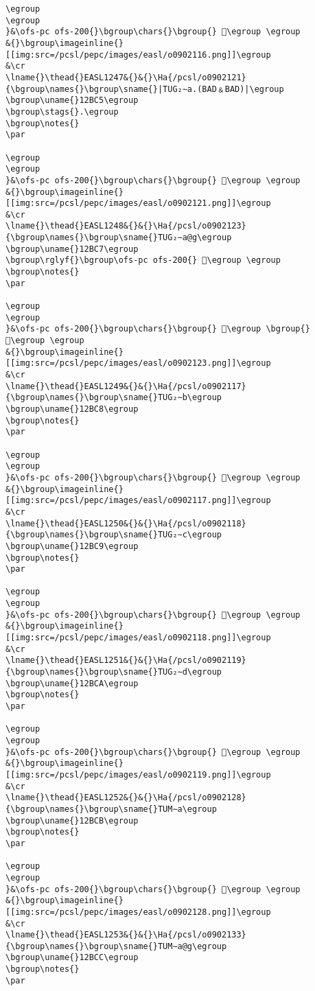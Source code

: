 \begin{verbatim}
\egroup
\egroup
}&\ofs-pc ofs-200{}\bgroup\chars{}\bgroup{} 𒯄\egroup \egroup
&{}\bgroup\imageinline{}[[img:src=/pcsl/pepc/images/easl/o0902116.png]]\egroup
&\cr
\lname{}\thead{}EASL1247&{}&{}\Ha{/pcsl/o0902121}{\bgroup\names{}\bgroup\sname{}|TUG₂∼a.(BAD﹠BAD)|\egroup
\bgroup\uname{}12BC5\egroup
\bgroup\stags{}.\egroup
\bgroup\notes{}
\par 

\egroup
\egroup
}&\ofs-pc ofs-200{}\bgroup\chars{}\bgroup{} 𒯅\egroup \egroup
&{}\bgroup\imageinline{}[[img:src=/pcsl/pepc/images/easl/o0902121.png]]\egroup
&\cr
\lname{}\thead{}EASL1248&{}&{}\Ha{/pcsl/o0902123}{\bgroup\names{}\bgroup\sname{}TUG₂∼a@g\egroup
\bgroup\uname{}12BC7\egroup
\bgroup\rglyf{}\bgroup\ofs-pc ofs-200{} 𒯇\egroup \egroup
\bgroup\notes{}
\par 

\egroup
\egroup
}&\ofs-pc ofs-200{}\bgroup\chars{}\bgroup{} 𒯆\egroup \bgroup{} 𒯇\egroup \egroup
&{}\bgroup\imageinline{}[[img:src=/pcsl/pepc/images/easl/o0902123.png]]\egroup
&\cr
\lname{}\thead{}EASL1249&{}&{}\Ha{/pcsl/o0902117}{\bgroup\names{}\bgroup\sname{}TUG₂∼b\egroup
\bgroup\uname{}12BC8\egroup
\bgroup\notes{}
\par 

\egroup
\egroup
}&\ofs-pc ofs-200{}\bgroup\chars{}\bgroup{} 𒯈\egroup \egroup
&{}\bgroup\imageinline{}[[img:src=/pcsl/pepc/images/easl/o0902117.png]]\egroup
&\cr
\lname{}\thead{}EASL1250&{}&{}\Ha{/pcsl/o0902118}{\bgroup\names{}\bgroup\sname{}TUG₂∼c\egroup
\bgroup\uname{}12BC9\egroup
\bgroup\notes{}
\par 

\egroup
\egroup
}&\ofs-pc ofs-200{}\bgroup\chars{}\bgroup{} 𒯉\egroup \egroup
&{}\bgroup\imageinline{}[[img:src=/pcsl/pepc/images/easl/o0902118.png]]\egroup
&\cr
\lname{}\thead{}EASL1251&{}&{}\Ha{/pcsl/o0902119}{\bgroup\names{}\bgroup\sname{}TUG₂∼d\egroup
\bgroup\uname{}12BCA\egroup
\bgroup\notes{}
\par 

\egroup
\egroup
}&\ofs-pc ofs-200{}\bgroup\chars{}\bgroup{} 𒯊\egroup \egroup
&{}\bgroup\imageinline{}[[img:src=/pcsl/pepc/images/easl/o0902119.png]]\egroup
&\cr
\lname{}\thead{}EASL1252&{}&{}\Ha{/pcsl/o0902128}{\bgroup\names{}\bgroup\sname{}TUM∼a\egroup
\bgroup\uname{}12BCB\egroup
\bgroup\notes{}
\par 

\egroup
\egroup
}&\ofs-pc ofs-200{}\bgroup\chars{}\bgroup{} 𒯋\egroup \egroup
&{}\bgroup\imageinline{}[[img:src=/pcsl/pepc/images/easl/o0902128.png]]\egroup
&\cr
\lname{}\thead{}EASL1253&{}&{}\Ha{/pcsl/o0902133}{\bgroup\names{}\bgroup\sname{}TUM∼a@g\egroup
\bgroup\uname{}12BCC\egroup
\bgroup\notes{}
\par 


\end{verbatim}
